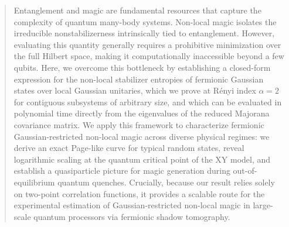 \documentclass[prx,twocolumn,superscriptaddress,aps,10pt, frontmatterverbose, reprint,footinbib,longbibliography=true]{revtex4-2}
\newcommand{\RENYI}{\alpha}
\providecommand{\DIFaddtex}[1]{{\protect\color{red}#1}} %
\providecommand{\DIFaddbegin}{\protect\color{red}} %
\providecommand{\DIFaddend}{\protect\color{black}} %
\providecommand{\DIFaddtex}[1]{\texorpdfstring{\DIFaddtex{#1}}{#1}} %
\providecommand{\DIFadd}[1]{\texorpdfstring{\DIFaddtex{#1}}{#1}} %
\newcommand{\DIFaddincludegraphics}[2][]{{\color{blue}\fbox{\DIFOincludegraphics[#1]{#2}}}} %
\DeclareRobustCommand{\DIFaddbegin}{\DIFOaddbegin \let\includegraphics\DIFaddincludegraphics} %
\DeclareRobustCommand{\DIFaddend}{\DIFOaddend \let\includegraphics\DIFOincludegraphics} %
\begin{document}
\begin{abstract}
Entanglement and magic are fundamental resources that capture the complexity of quantum many-body systems. Non-local magic isolates the irreducible nonstabilizerness intrinsically tied to entanglement. However, evaluating this quantity generally requires a prohibitive minimization over the full Hilbert space, making it computationally inaccessible beyond a few qubits. Here, we overcome this bottleneck by establishing a closed-form expression for the non-local stabilizer entropies of fermionic Gaussian states over local Gaussian unitaries, which we prove at R\'enyi index \DIFaddbegin \DIFadd{$\RENYI=2$ for contiguous subsystems of arbitrary }\DIFaddend size, and which can be evaluated in polynomial time directly from the eigenvalues of the reduced Majorana covariance matrix. We apply this framework to characterize fermionic Gaussian-restricted non-local magic across diverse physical regimes: we derive an exact Page-like curve for typical random states, reveal logarithmic scaling at the quantum critical point of the XY model, and establish a quasiparticle picture for magic generation during out-of-equilibrium quantum quenches. Crucially, because our result relies solely on two-point correlation functions, it provides a scalable route for the experimental estimation of Gaussian-restricted non-local magic in large-scale quantum processors via fermionic shadow tomography.
\end{abstract}


\maketitle
\end{document}
